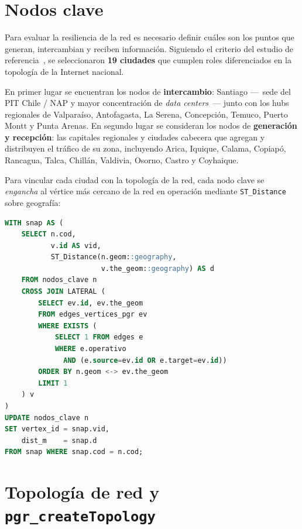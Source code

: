 \documentclass[12pt,a4paper]{article}
\begin{document}
\section{Nodos clave}

Para evaluar la resiliencia de la red es necesario definir cuáles son los
puntos que generan, intercambian y reciben información.  Siguiendo el
criterio del estudio de referencia~\cite{niclabs2018}, se seleccionaron
\textbf{19 ciudades} que cumplen roles diferenciados en la topología de
la Internet nacional.

En primer lugar se encuentran los nodos de \textbf{intercambio}: Santiago
---~sede del PIT Chile / NAP y mayor concentración de \textit{data
centers}~--- junto con los hubs regionales de Valparaíso, Antofagasta, La
Serena, Concepción, Temuco, Puerto Montt y Punta Arenas.  En segundo lugar
se consideran los nodos de \textbf{generación y recepción}: las capitales
regionales y ciudades cabecera que agregan y distribuyen el tráfico de su
zona, incluyendo Arica, Iquique, Calama, Copiapó, Rancagua, Talca,
Chillán, Valdivia, Osorno, Castro y Coyhaique.

Para vincular cada ciudad con la topología de la red, cada nodo clave se
\textit{engancha} al vértice más cercano de la red en operación mediante
\texttt{ST\_Distance} sobre geografía:

\begin{lstlisting}[language=SQL,caption={Snap de nodos clave a la red (03\_nodos\_clave.sql)}]
WITH snap AS (
    SELECT n.cod,
           v.id AS vid,
           ST_Distance(n.geom::geography,
                       v.the_geom::geography) AS d
    FROM nodos_clave n
    CROSS JOIN LATERAL (
        SELECT ev.id, ev.the_geom
        FROM edges_vertices_pgr ev
        WHERE EXISTS (
            SELECT 1 FROM edges e
            WHERE e.operativo
              AND (e.source=ev.id OR e.target=ev.id))
        ORDER BY n.geom <-> ev.the_geom
        LIMIT 1
    ) v
)
UPDATE nodos_clave n
SET vertex_id = snap.vid,
    dist_m    = snap.d
FROM snap WHERE snap.cod = n.cod;
\end{lstlisting}


\section{Topología de red y \texttt{pgr\_createTopology}}
\end{document}
